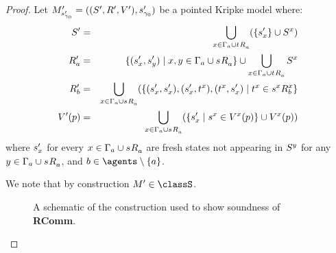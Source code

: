 \begin{proof}
Let $\kPModelAndTupleP{\kStateSP_{\gamma_0}}$ be a pointed Kripke model where:
\begin{eqnarray*}
    \kStatesP &=& \bigcup_{x \in \Gamma_\agentA \cup \kSuccessorsA{\kStateT}} (\{\kStateSP_x\} \cup \kStates[x])\\
    \kAccessibilityPA &=& \{(\kStateSP_x, \kStateSP_y) \mid x, y \in \Gamma_\agentA \cup \kSuccessorsA{\kStateS}\} \cup \bigcup_{x \in \Gamma_\agentA \cup \kSuccessorsA{\kStateT}} \kStates[x]\\
    \kAccessibilityPB &=& \bigcup_{x \in \Gamma_\agentA \cup \kSuccessorsA{\kStateS}} (\{(\kStateSP_x, \kStateSP_x), (\kStateSP_x, \kStateT[x]), (\kStateT[x], \kStateSP_x) \mid \kStateT[x] \in \kSuccessorsB[x]{\kStateS[x]}\}\\
    \kValuationP(\atomP) &=& \bigcup_{x \in \Gamma_\agentA \cup \kSuccessorsA{\kStateS}} (\{\kStateSP_x \mid \kStateS[x] \in \kValuation[x](\atomP)\} \cup \kValuation[x](\atomP))
\end{eqnarray*}
where $\kStateSP_x$ for every $x \in \Gamma_\agentA \cup \kSuccessorsA{\kStateS}$ are fresh states not appearing in $\kStates[y]$ for any $y \in \Gamma_\agentA \cup \kSuccessorsA{\kStateS}$, and $\agentB \in \agents \setminus \{\agentA\}$.

We note that by construction $\kModelP \in \classS$.

\begin{figure}
    \caption{A schematic of the construction used to show soundness of {\bf RComm}.}\label{rml-s5-rcomm-construction}
    \centering
    \begin{tikzpicture}[>=stealth',shorten >=1pt,auto,node distance=7em,thick]


\end{tikzpicture}
\end{figure}
\end{proof}
